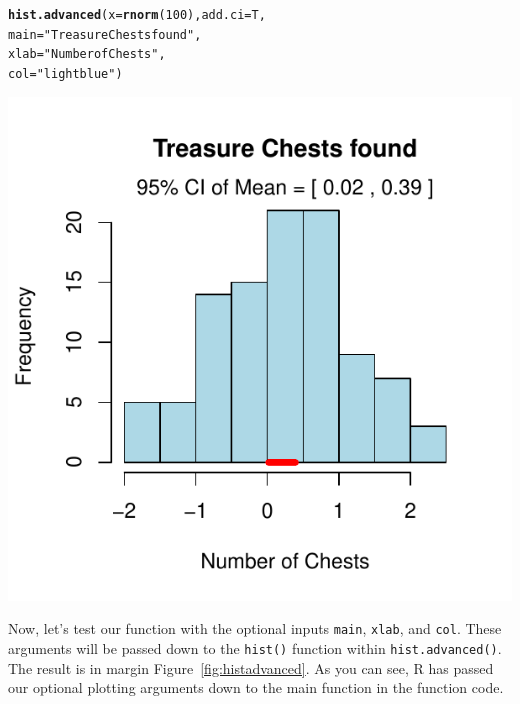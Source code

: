 \documentclass{tufte-book}\usepackage[]{graphicx}\usepackage[]{color}
\makeatletter
\def\maxwidth{ %
  \ifdim\Gin@nat@width>\linewidth
    \linewidth
  \else
    \Gin@nat@width
  \fi
}
\newcommand{\hlnum}[1]{\textcolor[rgb]{0.686,0.059,0.569}{#1}}%
\newcommand{\hlstr}[1]{\textcolor[rgb]{0.192,0.494,0.8}{#1}}%
\newcommand{\hlstd}[1]{\textcolor[rgb]{0.345,0.345,0.345}{#1}}%
\newcommand{\hlkwc}[1]{\textcolor[rgb]{0.333,0.667,0.333}{#1}}%
\newcommand{\hlkwd}[1]{\textcolor[rgb]{0.737,0.353,0.396}{\textbf{#1}}}%
\newenvironment{kframe}{%
 \def\at@end@of@kframe{}%
 \ifinner\ifhmode%
  \def\at@end@of@kframe{\end{minipage}}%
  \begin{minipage}{\columnwidth}%
 \fi\fi%
 \def\FrameCommand##1{\hskip\@totalleftmargin \hskip-\fboxsep
 \colorbox{shadecolor}{##1}\hskip-\fboxsep
     \hskip-\linewidth \hskip-\@totalleftmargin \hskip\columnwidth}%
 \MakeFramed {\advance\hsize-\width
   \@totalleftmargin\z@ \linewidth\hsize
   \@setminipage}}%
 {\par\unskip\endMakeFramed%
 \at@end@of@kframe}
\newenvironment{knitrout}{}{} %
\makeatother
\begin{document}
\begin{marginfigure}
\begin{knitrout}
\color{fgcolor}\begin{kframe}
\begin{alltt}
\hlkwd{hist.advanced}\hlstd{(}\hlkwc{x} \hlstd{=} \hlkwd{rnorm}\hlstd{(}\hlnum{100}\hlstd{),} \hlkwc{add.ci} \hlstd{= T,}
              \hlkwc{main} \hlstd{=} \hlstr{"Treasure Chests found"}\hlstd{,}
              \hlkwc{xlab} \hlstd{=} \hlstr{"Number of Chests"}\hlstd{,}
              \hlkwc{col} \hlstd{=} \hlstr{"lightblue"}\hlstd{)}
\end{alltt}
\end{kframe}
\includegraphics[width=\maxwidth]{figure/unnamed-chunk-318-1} 

\end{knitrout}
\label{fig:histadvanced}
\end{marginfigure}

Now, let's test our function with the optional inputs \texttt{main}, \texttt{xlab}, and \texttt{col}. These arguments will be passed down to the \texttt{hist()} function within \texttt{hist.advanced()}. The result is in margin Figure~\ref{fig:histadvanced}. As you can see, R has passed our optional plotting arguments down to the main  function in the function code.
\end{document}
